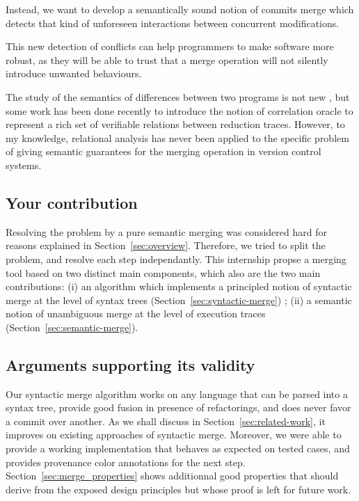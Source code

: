 \documentclass[a4paper,11pt]{article}
\newcommand\todo[1]{{\color{teal}(\textbf{TODO:} #1)}}
\begin{document}
Instead, we want to develop a semantically sound notion of commits
merge which detects that kind of unforeseen interactions between
concurrent modifications.

This new detection of conflicts can help programmers to make software
more robust, as they will be able to trust that a merge operation will
not silently introduce unwanted behaviours.

The study of the semantics of differences between two programs is not
new \cite{benton2004simple}, but some work has been done recently to
introduce the notion of correlation oracle \cite{girka2017verifiable}
to represent a rich set of verifiable relations between reduction
traces. However, to my knowledge, relational analysis has never been
applied to the specific problem of giving semantic guarantees for the
merging operation in version control systems.

\subsection*{Your contribution}


Resolving the problem by a pure semantic merging was considered hard for reasons explained in Section~\ref{sec:overview}. Therefore, we tried to split the problem, and resolve each step independantly.
This internship propse a merging tool based on two distinct main components, which also are the two main contributions: (i) an algorithm which implements a principled notion of
syntactic merge at the level of syntax trees (Section~\ref{sec:syntactic-merge}) ; (ii) a semantic notion of unambiguous merge
at the level of execution traces (Section~\ref{sec:semantic-merge}).

\subsection*{Arguments supporting its validity}


Our syntactic merge algorithm works on any language that can be parsed into a syntax tree, provide good fusion in presence of refactorings, and does never favor a commit over another. As we shall discuss in Section~\ref{sec:related-work}, it improves on existing approaches of syntactic merge. Moreover, we were able to provide a working implementation that behaves as expected on tested cases, and provides provenance color annotations for the next step.
Section~\ref{sec:merge_properties} shows additionnal good properties that should derive from the exposed design principles but whose proof is left for future work.
\end{document}
